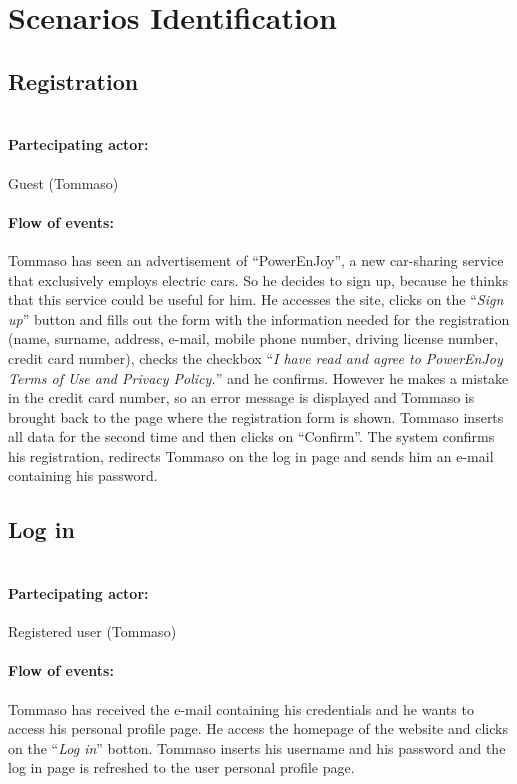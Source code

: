 \pagebreak
\section{Scenarios Identification}

\newcommand{\Scen}[2]{
    \paragraph{\\ Partecipating actor:} #1 
    \paragraph{Flow of events:} #2
}


\subsection{Registration}
 
\Scen{Guest (Tommaso)}{
	Tommaso has seen an advertisement of ``PowerEnJoy'', a new car-sharing service that exclusively employs electric cars. So he decides to sign up, because he thinks that this service could be useful for him.
    He accesses the site, clicks on the ``\textit{Sign up}'' button and fills out the form with the information needed for the registration (name, surname, address, e-mail, mobile phone number, driving license number, credit card number), checks the checkbox ``\textit{I have read and agree to PowerEnJoy Terms of Use and Privacy Policy.}'' and he confirms.
    However he makes a mistake in the credit card number, so an error message is displayed and Tommaso is brought back to the page where the registration form is shown. Tommaso inserts all data for the second time and then clicks on ``Confirm''.
    The system confirms his registration, redirects Tommaso on the log in page and sends him an e-mail containing his password.
}


\subsection{Log in}

\Scen{Registered user (Tommaso)}{
	Tommaso has received the e-mail containing his credentials and he wants to access his personal profile page.
	He access the homepage of the website and clicks on the ``\textit{Log in}'' botton. 
	Tommaso inserts his username and his password and the log in page is refreshed to the user personal profile page.
}

